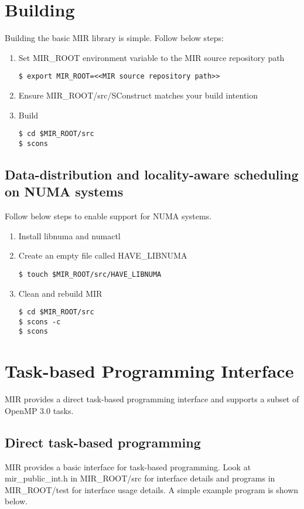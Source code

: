 \documentclass[11pt,a4paper,notitlepage]{article}
\begin{document}
\section{Building}
Building the basic MIR library is simple. Follow below steps:
\begin{enumerate}
\item Set MIR\_ROOT environment variable to the MIR source repository path
\begin{lstlisting}[style=BashInputStyle]
$ export MIR_ROOT=<<MIR source repository path>>
\end{lstlisting}
\item Ensure MIR\_ROOT/src/SConstruct matches your build intention
\item Build
\begin{lstlisting}[style=BashInputStyle]
$ cd $MIR_ROOT/src
$ scons 
\end{lstlisting}
\end{enumerate}

\subsection{Data-distribution and locality-aware scheduling on NUMA systems}
Follow below steps to enable support for NUMA systems.
\begin{enumerate}
\item Install libnuma and numactl
\item Create an empty file called HAVE\_LIBNUMA
\begin{lstlisting}[style=BashInputStyle]
$ touch $MIR_ROOT/src/HAVE_LIBNUMA
\end{lstlisting}
\item Clean and rebuild MIR
\begin{lstlisting}[style=BashInputStyle]
$ cd $MIR_ROOT/src
$ scons -c
$ scons 
\end{lstlisting}
\end{enumerate}

\section{Task-based Programming Interface}
MIR provides a direct task-based programming interface and supports a subset of OpenMP 3.0 tasks.

\subsection{Direct task-based programming}
MIR provides a basic interface for task-based programming. Look at mir\_public\_int.h in MIR\_ROOT/src for interface details and programs in MIR\_ROOT/test for interface usage details. A simple example program is shown below. 
\end{document}

